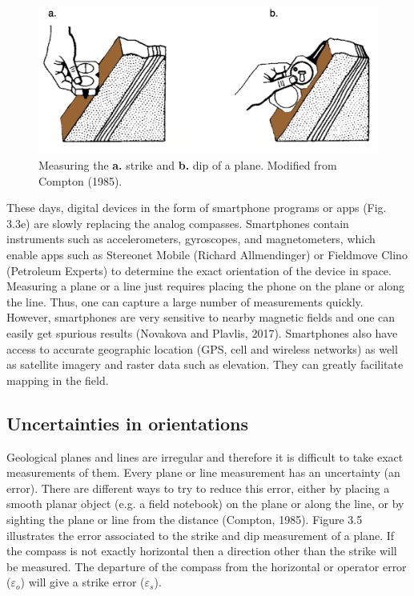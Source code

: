 \documentclass[a4paper , 12pt]{book}
\begin{document}
\begin{figure}[ht]
    \centering
    \includegraphics[width=12cm]{Figures/ch3f4.png}
    \caption{Measuring the \textbf{a.} strike and \textbf{b.} dip of a plane. Modified from Compton (1985).}
\end{figure}

These days, digital devices in the form of smartphone programs or apps (Fig. 3.3e) are slowly replacing the analog compasses. Smartphones contain instruments such as accelerometers, gyroscopes, and magnetometers, which enable apps such as Stereonet Mobile (Richard Allmendinger) or Fieldmove Clino (Petroleum Experts) to determine the exact orientation of the device in space. Measuring a plane or a line just requires placing the phone on the plane or along the line. Thus, one can capture a large number of measurements quickly. However, smartphones are very sensitive to nearby magnetic fields and one can easily get spurious results (Novakova and Plavlis, 2017). Smartphones also have access to accurate geographic location (GPS, cell and wireless networks) as well as satellite imagery and raster data such as elevation. They can greatly facilitate mapping in the field.

\subsection{Uncertainties in orientations}

Geological planes and lines are irregular and therefore it is difficult to take exact measurements of them. Every plane or line measurement has an uncertainty (an error). There are different ways to try to reduce this error, either by placing a smooth planar object (e.g. a field notebook) on the plane or along the line, or by sighting the plane or line from the distance (Compton, 1985). Figure 3.5 illustrates the error associated to the strike and dip measurement of a plane. If the compass is not exactly horizontal then a direction other than the strike will be measured. The departure of the compass from the horizontal or operator error ($\varepsilon_o$) will give a strike error ($\varepsilon_s$).
\end{document}
